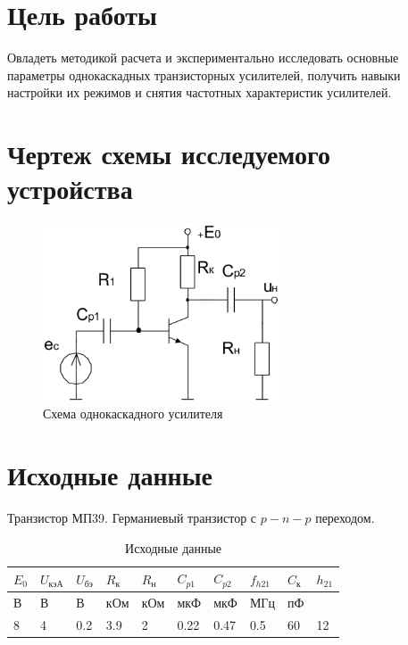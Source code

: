 





\section{Цель работы}

Овладеть методикой расчета и экспериментально исследовать основные параметры однокаскадных транзисторных усилителей, получить навыки настройки их режимов и снятия частотных характеристик усилителей.

\section{Чертеж схемы исследуемого устройства}

\begin{figure}[H]
	\begin{center}
	\vspace{-0.5cm}
		\includegraphics[width=7cm]{img/scheme}
		\caption{Схема однокаскадного усилителя}
		\label{figure:1}
	\vspace{-0.5cm}
	\end{center}
\end{figure}

\section{Исходные данные}

Транзистор МП39. Германиевый транзистор с $p-n-p$ переходом.

\begin{table}[H]
	\begin{center}
	\caption{Исходные данные}
	\def\arraystretch{1.4}
		\begin{tabularx}{\textwidth}{|X|X|X|X|X|X|X|X|X|X|}
			\hline
			$E_0$ &
			$U_\text{кэА}$ &
			$U_\text{бэ}$ &
			$R_\text{к}$ &
			$R_\text{н}$ &
			$C_{p1}$ &
			$C_{p2}$ &
			$f_{h21}$ &
			$C_\text{к}$ &
			$h_{21}$ \\
			\hline
			В &
			В &
			В &
			кОм &
			кОм &
			мкФ &
			мкФ &
			МГц &
			пФ &
			\\
			\hline
			8 &
			4 &
			0.2 &
			3.9 &
			2 &
			0.22 &
			0.47 &
			0.5 &
			60 &
			12 \\
		    \hline	
		\end{tabularx}
		\label{tabular:1}
	\end{center}
\end{table}

